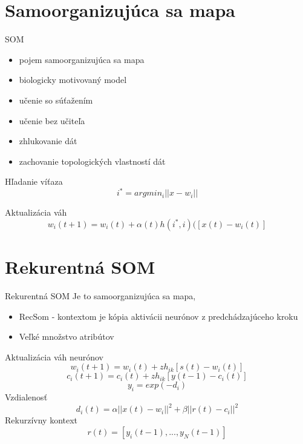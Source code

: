 \documentclass[10pt]{beamer}
\begin{document}
\section{Samoorganizujúca sa mapa}
\begin{frame}[fragile]{SOM}

\begin{itemize}
  \item pojem samoorganizujúca sa mapa
  \item biologicky motivovaný model
  \item učenie so súťažením
  \item učenie bez učiteľa
  \item zhlukovanie dát
  \item zachovanie topologických vlastností dát
\end{itemize}

Hľadanie víťaza
\begin{equation*}
i^* = argmin_i||x-w_i|| 
\end{equation*}

Aktualizácia váh
\begin{equation*}
w_i(t+1) = w_i(t) + \alpha(t)h(i^*, i)([x(t) - w_i(t)]
\end{equation*}

\end{frame}

\section{Rekurentná SOM}

\begin{frame}[fragile]{Rekurentná SOM}
Je to samoorganizujúca sa mapa, 
\begin{itemize}
\item RecSom - kontextom je kópia aktivácii neurónov z predchádzajúceho kroku
\item Veľké množstvo atribútov
\end{itemize}
Aktualizácia váh neurónov
\begin{equation*}
w_i(t+1) = w_i(t) + zh_{ik}[s(t) - w_i(t)]
\end{equation*}
\begin{equation*}
c_i(t+1) = c_i(t) + zh_{ik}[y(t - 1) - c_i(t)]
\end{equation*}
\begin{equation*}
y_i=exp(-d_i)
\end{equation*}
Vzdialenosť
\begin{equation*}
d_i(t) = \alpha||x(t)-w_i||^2 + \beta||r(t)-c_i||^2
\end{equation*}
Rekurzívny kontext
\begin{equation*}
r(t)=[y_i(t-1),...,y_N(t-1)]
\end{equation*}
\end{frame}
\end{document}
